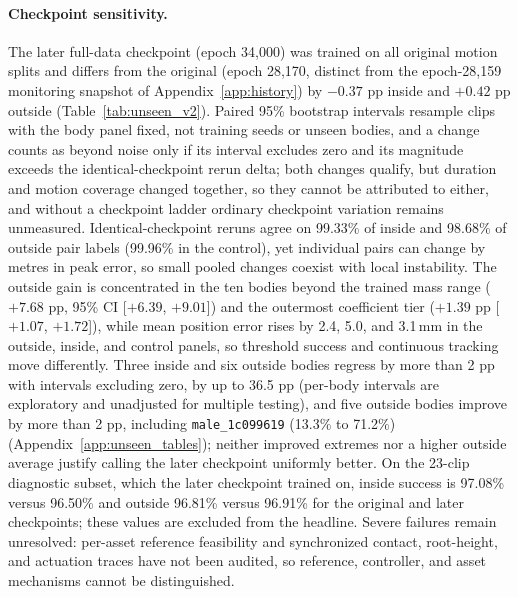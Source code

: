 \paragraph{Checkpoint sensitivity.}
The later full-data checkpoint (epoch 34,000) was trained on all original motion
splits and differs from the original (epoch 28,170, distinct from the epoch-28,159
monitoring snapshot of Appendix~\ref{app:history}) by $-0.37$ pp inside and
$+0.42$ pp outside (Table~\ref{tab:unseen_v2}). Paired 95\% bootstrap intervals
resample clips with the body panel fixed, not training seeds or unseen bodies,
and a change counts as beyond noise only if its interval excludes zero and its
magnitude exceeds the identical-checkpoint rerun delta; both changes qualify,
but duration and motion coverage changed together, so they cannot be attributed
to either, and without a checkpoint ladder ordinary checkpoint variation remains
unmeasured. Identical-checkpoint reruns agree on 99.33\% of inside and 98.68\%
of outside pair labels (99.96\% in the control), yet individual pairs can change
by metres in peak error, so small pooled changes coexist with local instability.
The outside gain is concentrated in the ten bodies beyond the trained mass range
($+7.68$ pp, 95\% CI [$+6.39$, $+9.01$]) and the outermost coefficient tier
($+1.39$ pp [$+1.07$, $+1.72$]), while mean position error rises by 2.4, 5.0, and
3.1\,mm in the outside, inside, and control panels, so threshold success and
continuous tracking move differently. Three inside and six outside bodies regress
by more than 2 pp with intervals excluding zero, by up to 36.5 pp (per-body
intervals are exploratory and unadjusted for multiple testing), and five outside
bodies improve by more than 2 pp, including \texttt{male\_1c099619} (13.3\% to
71.2\%) (Appendix~\ref{app:unseen_tables}); neither improved extremes nor a
higher outside average justify calling the later checkpoint uniformly better. On
the 23-clip diagnostic subset, which the later checkpoint trained on, inside
success is 97.08\% versus 96.50\% and outside 96.81\% versus 96.91\% for the
original and later checkpoints; these values are excluded from the headline.
Severe failures remain unresolved: per-asset reference feasibility and
synchronized contact, root-height, and actuation traces have not been audited, so
reference, controller, and asset mechanisms cannot be distinguished.

